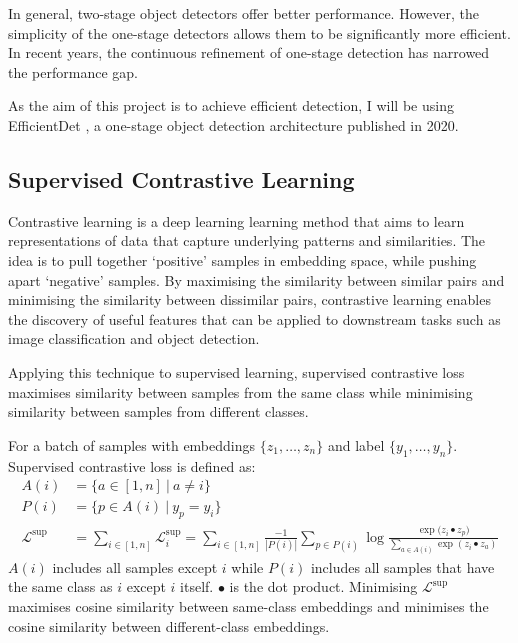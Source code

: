 \documentclass[12pt,a4paper,twoside,openright]{report}
\newcommand{\suploss}{\mathcal{L}^\text{sup}}
\begin{document}
In general, two-stage object detectors offer better performance. However, the simplicity of the one-stage detectors allows them to be significantly more efficient. In recent years, the continuous refinement of one-stage detection has narrowed the performance gap.

As the aim of this project is to achieve efficient detection, I will be using EfficientDet \cite{tan_efficientdet_2020}, a one-stage object detection architecture published in 2020.

\subsection{Supervised Contrastive Learning}
Contrastive learning is a deep learning learning method that aims to learn representations of data that capture underlying patterns and similarities. The idea is to pull together `positive' samples in embedding space, while pushing apart `negative' samples. By maximising the similarity between similar pairs and minimising the similarity between dissimilar pairs, contrastive learning enables the discovery of useful features that can be applied to downstream tasks such as image classification and object detection.

Applying this technique to supervised learning, supervised contrastive loss \cite{khosla_supervised_2021} maximises similarity between samples from the same class while minimising similarity between samples from different classes. 

For a batch of samples with embeddings $\{\mathit{z}_1, \dots, \mathit{z}_n\}$ and label $\{y_1, \dots, y_n\}$. Supervised contrastive loss is defined as:
\begin{align}
    A(i) &= \{a \in [1,n]\ |\ a \neq i\}\\
    P(i) &= \{p \in A(i)\ |\ y_p = y_i\}\\
    \suploss &= \sum\limits_{i\in [1, n]}\suploss_i=\sum\limits_{i\in [1, n]}\frac{-1}{|P(i)|}
    \sum\limits_{p\in P(i)}\log\frac{\exp{(\mathit{z}_i \bullet \mathit{z}_p})}{\sum\limits_{a \in A(i)}\exp{(\mathit{z}_i \bullet \mathit{z}_a)}} \label{eq:supcon}   
\end{align}
$A(i)$ includes all samples except $i$ while $P(i)$ includes all samples that have the same class as $i$ except $i$ itself. $\bullet$ is the dot product. Minimising $\suploss$ maximises cosine similarity between same-class embeddings and minimises the cosine similarity between different-class embeddings.
\end{document}

